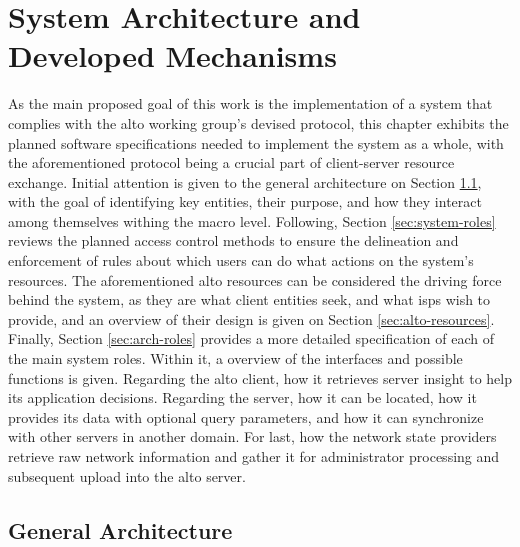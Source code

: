 \chapter{System Architecture and Developed Mechanisms}

\label{sec:specification}

    As the main proposed goal of this work is the implementation of a system that complies with the \gls{alto} working group's devised protocol, this chapter exhibits the planned software specifications needed to implement the system as a whole, with the aforementioned protocol being a crucial part of client-server resource exchange.
    Initial attention is given to the general architecture on Section \ref{sec:arch-general}, with the goal of identifying key entities, their purpose, and how they interact among themselves withing the macro level.
    Following, Section \ref{sec:system-roles} reviews the planned access control methods to ensure the delineation and enforcement of rules about which users can do what actions on the system's resources.
    The aforementioned \gls{alto} resources can be considered the driving force behind the system, as they are what client entities seek, and what \glspl{isp} wish to provide, and an overview of their design is given on Section \ref{sec:alto-resources}.
    Finally, Section \ref{sec:arch-roles} provides a more detailed specification of each of the main system roles.
    Within it, a overview of the interfaces and possible functions is given.
    Regarding the \gls{alto} client, how it retrieves server insight to help its application decisions.
    Regarding the server, how it can be located, how it provides its data with optional query parameters, and how it can synchronize with other servers in another domain.
    For last, how the network state providers retrieve raw network information and gather it for administrator processing and subsequent upload into the \gls{alto} server.

\section{General Architecture}

\label{sec:arch-general}

